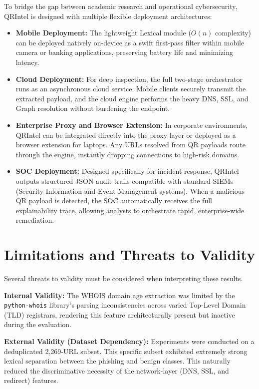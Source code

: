 \documentclass[10pt,twocolumn,letterpaper]{article}
\begin{document}
To bridge the gap between academic research and operational cybersecurity, QRIntel is designed with multiple flexible deployment architectures:
\begin{itemize}
    \item \textbf{Mobile Deployment:} The lightweight Lexical module ($O(n)$ complexity) can be deployed natively on-device as a swift first-pass filter within mobile camera or banking applications, preserving battery life and minimizing latency.
    \item \textbf{Cloud Deployment:} For deep inspection, the full two-stage orchestrator runs as an asynchronous cloud service. Mobile clients securely transmit the extracted payload, and the cloud engine performs the heavy DNS, SSL, and Graph resolution without burdening the endpoint.
    \item \textbf{Enterprise Proxy and Browser Extension:} In corporate environments, QRIntel can be integrated directly into the proxy layer or deployed as a browser extension for laptops. Any URLs resolved from QR payloads route through the engine, instantly dropping connections to high-risk domains.
    \item \textbf{SOC Deployment:} Designed specifically for incident response, QRIntel outputs structured JSON audit trails compatible with standard SIEMs (Security Information and Event Management systems). When a malicious QR payload is detected, the SOC automatically receives the full explainability trace, allowing analysts to orchestrate rapid, enterprise-wide remediation.
\end{itemize}

\section{Limitations and Threats to Validity}

Several threats to validity must be considered when interpreting these results. 

\textbf{Internal Validity:} The WHOIS domain age extraction was limited by the \texttt{python-whois} library's parsing inconsistencies across varied Top-Level Domain (TLD) registrars, rendering this feature architecturally present but inactive during the evaluation. 

\textbf{External Validity (Dataset Dependency):} Experiments were conducted on a deduplicated 2,269-URL subset. This specific subset exhibited extremely strong lexical separation between the phishing and benign classes. This naturally reduced the discriminative necessity of the network-layer (DNS, SSL, and redirect) features. 
\end{document}

